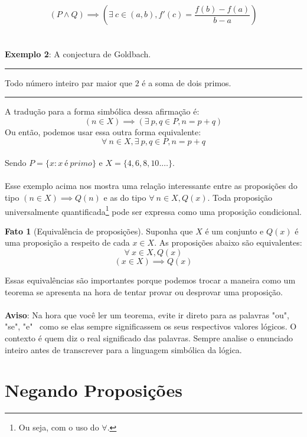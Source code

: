 \documentclass[a4paper,11pt,oneside]{book}
\theoremstyle{definition}
\theoremstyle{break}
\newtheorem{fact}{Fato}[section]
\begin{document}
$$ \left( P \land Q \right) \implies \left(\exists \ c \in (a,b), f'(c) = \dfrac{f(b) - f(a)}{b - a} \right) $$
\\
\\
\textbf{Exemplo 2}: A conjectura de Goldbach.
\\
\hrule
\vspace{5pt}
Todo número inteiro par maior que $2$ é a soma de dois primos.
\vspace{5pt}
\hrule
\vspace{5pt}
A tradução para a forma simbólica dessa afirmação é:
$$ \left( n \in X \right) \implies \left( \exists \ p,q \in P, n = p + q \right) $$
Ou então, podemos usar essa outra forma equivalente:
$$ \forall \ n \in X, \exists \ p,q \in P, n = p + q $$
\\
Sendo $P = \{x : x \ é \ primo \}$ e $X = \{ 4,6,8,10.\dots \}$. 
\\
\\
Esse exemplo acima nos mostra uma relação interessante entre as proposições do tipo $(n \in X) \implies Q(n)$ e as do tipo $\forall \ n \in X, Q(x)$. Toda proposição universalmente quantificada\footnote{Ou seja, com o uso do $\forall$.} pode ser expressa como uma proposição condicional.


\begin{fact}[Equivalência de proposições]
Suponha que $X$ é um conjunto e $Q(x)$ é uma proposição a respeito de cada $x \in X$. As proposições abaixo são equivalentes:
$$ \forall \ x \in X, Q(x) $$
$$ (x \in X) \implies Q(x) $$
\end{fact}

Essas equivalências são importantes porque podemos trocar a maneira como um teorema se apresenta na hora de tentar provar ou desprovar uma proposição.
\\
\\
\textbf{Aviso}: Na hora que você ler um teorema, evite ir direto para as palavras "ou", "se", "e" \ como se elas sempre significassem os seus respectivos valores lógicos. O contexto é quem diz o real significado das palavras. Sempre analise o enunciado inteiro antes de transcrever para a linguagem simbólica da lógica.

\section{Negando Proposições}
\end{document}
